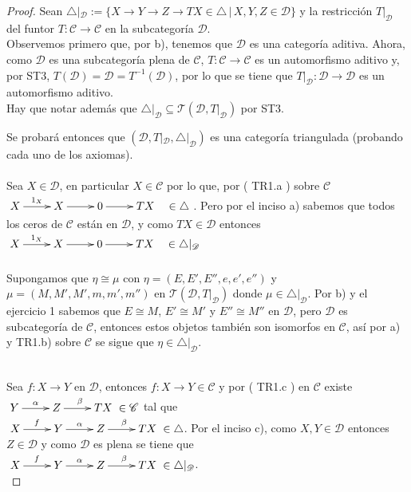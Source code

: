 \documentclass{article}
\begin{document}
\begin{enumerate}[label=\textbf{Ej \arabic*.}]
\begin{proof}
			 Sean $\triangle|_{\mathscr{D}}:=\{X\to Y\to Z\to TX\in \triangle\,|\, X,Y,Z\in \mathscr{D}\}$ y la restricción $T|_{\mathscr{D}}$ del
			funtor $T:\mathscr{C}\longrightarrow \mathscr{C}$ en la subcategoría $\mathscr{D}$.\\
			
			Observemos primero que, por b), tenemos que $\mathscr{D}$ es una categoría aditiva. Ahora, como $\mathscr{D}$ es una subcategoría plena de 
			$\mathscr{C}$, $T:\mathscr{C}\to \mathscr{C}$ es un automorfismo aditivo y, por ST3, $T(\mathscr{D})=\mathscr{D}=T^{-1}(\mathscr{D})$,
			por lo que se tiene que $T|_{\mathscr{D}}:\mathscr{D}\to \mathscr{D}$ es un automorfismo aditivo.\\
			Hay que notar además que $\triangle|_{\mathscr{D}}\subseteq \mathcal{T}(\mathscr{D},T|_{\mathscr{D}})$ por ST3.
			
			Se probará entonces que $(\mathscr{D},T|_{\mathscr{D}},\triangle|_{\mathscr{D}})$ es una categoría triangulada (probando cada uno de los axiomas).\\
			
			\\
			Sea $X\in \mathscr{D}$, en particular  $X\in \mathscr{C}$ por lo que, por ( TR1.a ) sobre $\mathscr{C}$
			\\$\xymatrix{X\ar[r]^{1_X}&X\ar[r]&0\ar[r]&TX\quad\in \triangle}$.
			Pero por el inciso a) sabemos que todos los ceros de $\mathscr{C}$ están en $\mathscr{D}$, y como $TX\in \mathscr{D}$  entonces \\
			$\xymatrix{X\ar[r]^{1_X}&X\ar[r]&0\ar[r]&TX\quad\in \triangle|_{\mathscr{D}}}$\\
			
			\\
			
			Supongamos que $\eta\cong \mu$ con $\eta=(E,E',E'',e,e',e'')$ y $\mu=(M,M',M',m,m',m'')$ en $\mathcal{T}(\mathscr{D},T|_{\mathscr{D}})$ donde
			$\mu\in \triangle|_{\mathscr{D}}$. Por b) y el ejercicio 1 sabemos que $E\cong M$, $E'\cong M'$ y $E''\cong M''$ en $\mathscr{D}$, pero 
			$\mathscr{D}$ es subcategoría de $\mathscr{C}$, entonces estos objetos también son isomorfos en $\mathscr{C}$, así por a) y TR1.b) sobre 
			$\mathscr{C}$ se sigue que $\eta\in \triangle|_{\mathscr{D}}$.
			
			\\
			Sea $f:X\to Y$ en $\mathscr{D}$, entonces $f:X\to Y\in \mathscr{C}$ y por ( TR1.c ) en $\mathscr{C}$ existe
			$\xymatrix{Y\ar[r]^{\alpha}&Z\ar[r]^{\beta}&TX}\in \mathscr{C}$ tal que \\
			$\xymatrix{X\ar[r]^{f}&Y\ar[r]^{\alpha}&Z\ar[r]^{\beta}&TX}\in \triangle$. Por el inciso c), como $X,Y\in \mathscr{D}$ entonces $Z\in \mathscr{D}$
			y como $\mathscr{D}$ es plena se tiene que \\$\xymatrix{X\ar[r]^{f}&Y\ar[r]^{\alpha}&Z\ar[r]^{\beta}&TX}\in \triangle|_{\mathscr{D}}$.\\
			

\end{proof}
\end{enumerate}
\end{document}
